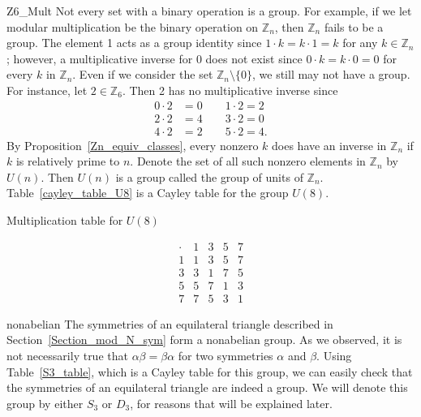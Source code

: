 \begin{example}{Z6_Mult}
Not every set with a binary operation is a group.  For example, if we let modular multiplication be the binary operation on ${\mathbb Z}_n$, then ${\mathbb Z}_n$ fails to be a group.  The element 1 acts as a group identity since $1 \cdot k = k \cdot 1 = k$ for any $k \in {\mathbb Z}_n$; however, a multiplicative inverse for $0$ does not exist since $0 \cdot k = k \cdot 0 = 0$ for every $k$ in ${\mathbb Z}_n$.  Even if we consider the set ${\mathbb Z}_n \setminus \{0 \}$, we still may not have a group.  For instance, let $2 \in {\mathbb Z}_6$. Then 2 has no multiplicative inverse since 
\begin{align*}
0 \cdot 2 & = 0 \qquad 1 \cdot 2 = 2 \\
2 \cdot 2 & = 4 \qquad 3 \cdot 2 = 0 \\
4 \cdot 2 & = 2 \qquad 5 \cdot 2 = 4.
\end{align*}
By Proposition~\ref{Zn_equiv_classes}, every nonzero $k$ does have an inverse in ${\mathbb Z}_n$ if $k$ is relatively prime to $n$.  Denote the set of all such nonzero elements in ${\mathbb Z}_n$ by $U(n)$\label{groupofunits}.  Then $U(n)$ is a group called the {\bfi group of units\/} of ${\mathbb Z}_n$.  Table~\ref{cayley_table_U8} is a Cayley table for the group $U(8)$. 
\end{example}

\begin{table}[htb]
\caption{Multiplication table for $U(8)$}{\small
\[
\begin{array}{c|cccc}
\cdot & 1 & 3 & 5 & 7 \\
\hline
1     & 1 & 3 & 5 & 7 \\
3     & 3 & 1 & 7 & 5 \\
5     & 5 & 7 & 1 & 3 \\
7     & 7 & 5 & 3 & 1
\end{array}
\]
}
\label{cayley_table_U8}
\end{table}



\begin{example}{nonabelian}
The symmetries of an equilateral triangle described in Section~\ref{Section_mod_N_sym} form a nonabelian group. As we observed, it is not necessarily true that $\alpha \beta = \beta \alpha$ for two symmetries $\alpha$ and $\beta$.  Using Table~\ref{S3_table}, which is a Cayley table for this group, we can easily check that the symmetries of an equilateral triangle are indeed a group. We will denote this group by either $S_3$ or $D_3$, for reasons that will be explained later. 
\end{example}



